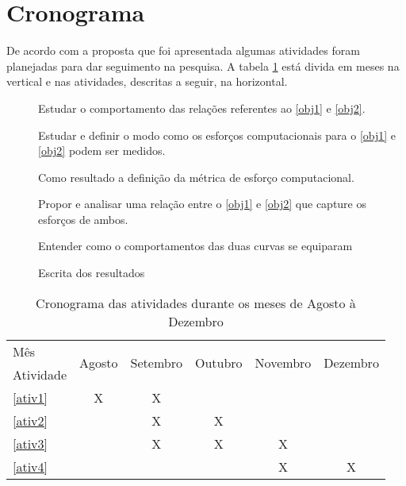 \section{Cronograma}

De acordo com a proposta que foi apresentada algumas atividades foram planejadas para dar seguimento na pesquisa. A tabela \ref{cronograma} está divida em meses na vertical e nas atividades, descritas a seguir, na horizontal. 


\begin{description}
\item[] Estudar o comportamento das relações referentes ao \ref{obj1} e \ref{obj2}.

\item[] Estudar e definir o modo como os esforços computacionais para o \ref{obj1} e \ref{obj2} podem ser medidos.

Como resultado a definição da métrica de esforço computacional.

\item[] Propor e analisar uma relação entre o \ref{obj1} e \ref{obj2} que capture os esforços de ambos.

Entender como o comportamentos das duas curvas se equiparam

\item[] Escrita dos resultados 


\end{description}

\begin{table}[!htbp]
\centering
\caption{Cronograma das atividades durante os meses de Agosto à Dezembro}
\label{cronograma}
\begin{tabular}{|l|c|c|c|c|c|}
\hline
Mês & \multicolumn{1}{l|}{\multirow{2}{*}{Agosto}} & \multicolumn{1}{l|}{\multirow{2}{*}{Setembro}} & \multicolumn{1}{l|}{\multirow{2}{*}{Outubro}} & \multicolumn{1}{l|}{\multirow{2}{*}{Novembro}} & \multicolumn{1}{l|}{\multirow{2}{*}{Dezembro}} \\ \cline{1-1}
Atividade & \multicolumn{1}{l|}{} & \multicolumn{1}{l|}{} & \multicolumn{1}{l|}{} & \multicolumn{1}{l|}{} & \multicolumn{1}{l|}{} \\ \hline
\ref{ativ1} & X & X &  &  &  \\ \hline
\ref{ativ2} &  & X & X &  &  \\ \hline
\ref{ativ3} &  & X & X & X &  \\ \hline
\ref{ativ4} &  &  &  & X & X \\ \hline
\end{tabular}
\end{table}










